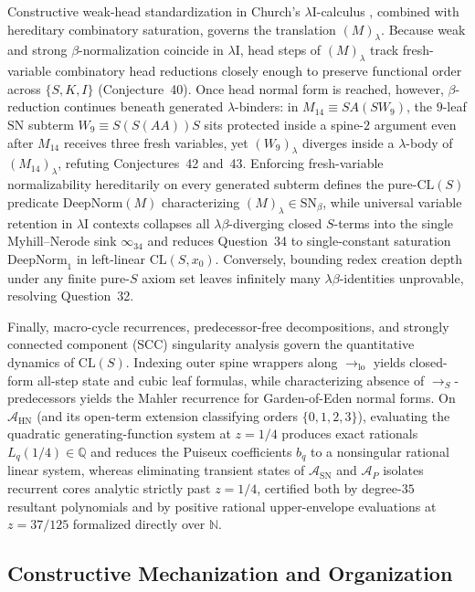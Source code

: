 \documentclass[11pt,reqno]{amsart}
\numberwithin{equation}{section}
\theoremstyle{plain}
\theoremstyle{definition}
\theoremstyle{remark}
\newcommand{\CLS}{\mathrm{CL}(S)}
\newcommand{\SN}{\mathrm{SN}}
\newcommand{\HN}{\mathrm{HN}}
\newcommand{\redS}{\to_S}
\begin{document}
Constructive weak-head standardization in Church's $\lambda\mathrm{I}$-calculus \cite{Church1941}, combined with hereditary combinatory saturation, governs the translation $(M)_\lambda$. Because weak and strong $\beta$-normalization coincide in $\lambda\mathrm{I}$, head steps of $(M)_\lambda$ track fresh-variable combinatory head reductions closely enough to preserve functional order across $\{S, K, I\}$ (Conjecture~40). Once head normal form is reached, however, $\beta$-reduction continues beneath generated $\lambda$-binders: in $M_{14} \equiv S A (S W_9)$, the $9$-leaf $\SN$ subterm $W_9 \equiv S(S(A A))S$ sits protected inside a spine-$2$ argument even after $M_{14}$ receives three fresh variables, yet $(W_9)_\lambda$ diverges inside a $\lambda$-body of $(M_{14})_\lambda$, refuting Conjectures~42 and~43. Enforcing fresh-variable normalizability hereditarily on every generated subterm defines the pure-$\CLS$ predicate $\mathrm{DeepNorm}(M)$ characterizing $(M)_\lambda \in \SN_\beta$, while universal variable retention in $\lambda\mathrm{I}$ contexts collapses all $\lambda\beta$-diverging closed $S$-terms into the single Myhill--Nerode sink $\infty_{34}$ and reduces Question~34 to single-constant saturation $\mathrm{DeepNorm}_1$ in left-linear $\mathrm{CL}(S, x_0)$. Conversely, bounding redex creation depth under any finite pure-$S$ axiom set leaves infinitely many $\lambda\beta$-identities unprovable, resolving Question~32.

Finally, macro-cycle recurrences, predecessor-free decompositions, and strongly connected component (SCC) singularity analysis govern the quantitative dynamics of $\CLS$. Indexing outer spine wrappers along $\to_{\mathrm{lo}}$ yields closed-form all-step state and cubic leaf formulas, while characterizing absence of $\redS$-predecessors yields the Mahler recurrence for Garden-of-Eden normal forms. On $\mathcal{A}_{\HN}$ (and its open-term extension classifying orders $\{0,1,2,3\}$), evaluating the quadratic generating-function system at $z = 1/4$ produces exact rationals $L_q(1/4) \in \mathbb{Q}$ and reduces the Puiseux coefficients $b_q$ to a nonsingular rational linear system, whereas eliminating transient states of $\mathcal{A}_{\SN}$ and $\mathcal{A}_P$ isolates recurrent cores analytic strictly past $z = 1/4$, certified both by degree-$35$ resultant polynomials and by positive rational upper-envelope evaluations at $z = 37/125$ formalized directly over $\mathbb{N}$.

\subsection{Constructive Mechanization and Organization}\label{subsec:intro-mechanization}
\end{document}
